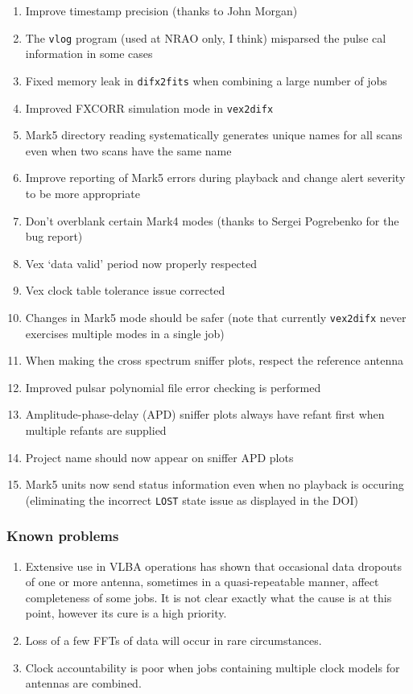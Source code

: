 \begin{enumerate}
\item Improve timestamp precision (thanks to John Morgan)
\item The {\tt vlog} program (used at NRAO only, I think) misparsed the pulse cal information in some cases
\item Fixed memory leak in {\tt difx2fits} when combining a large number of jobs
\item Improved FXCORR simulation mode in {\tt vex2difx}
\item Mark5 directory reading systematically generates unique names for all scans even when two scans have the same name
\item Improve reporting of Mark5 errors during playback and change alert severity to be more appropriate
\item Don't overblank certain Mark4 modes (thanks to Sergei Pogrebenko for the bug report)
\item Vex `data valid' period now properly respected
\item Vex clock table tolerance issue corrected
\item Changes in Mark5 mode should be safer (note that currently {\tt vex2difx} never exercises multiple modes in a single job)
\item When making the cross spectrum sniffer plots, respect the reference antenna
\item Improved pulsar polynomial file error checking is performed
\item Amplitude-phase-delay (APD) sniffer plots always have refant first when multiple refants are supplied
\item Project name should now appear on sniffer APD plots
\item Mark5 units now send status information even when no playback is occuring (eliminating the incorrect {\tt LOST} state issue as displayed in the DOI)
\end{enumerate}

\subsubsection{Known problems}

\begin{enumerate}
\item Extensive use in VLBA operations has shown that occasional data dropouts of one or more antenna, sometimes in a quasi-repeatable manner, affect completeness of some jobs.  
It is not clear exactly what the cause is at this point, however its cure is a high priority.
\item Loss of a few FFTs of data will occur in rare circumstances.
\item Clock accountability is poor when jobs containing multiple clock models for antennas are combined.
\end{enumerate}

